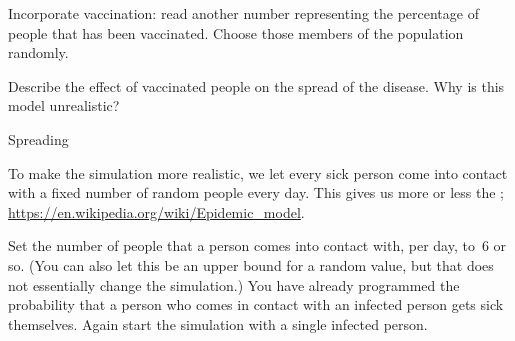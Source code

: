 \begin{exercise}
  \label{ex:infect:2}
  Incorporate vaccination: read another number representing the
  percentage of people that has been vaccinated. Choose those members
  of the population randomly.

  Describe the effect of vaccinated people on the spread of the
  disease. Why is this model unrealistic?
\end{exercise}

 {Spreading}
\label{sec:infect-spread}

To make the simulation more realistic, we let every sick person come
into contact with a fixed number of random people every day. This
gives us more or less the ;
\url{https://en.wikipedia.org/wiki/Epidemic_model}.

Set the number of people that a person comes into contact with, per
day, to~6 or so. (You can also let this be an upper bound for a random
value, but that
does not essentially change the simulation.) You have already programmed the probability that a
person who comes in contact with an infected person gets sick themselves.
Again start the simulation with a single infected person.

